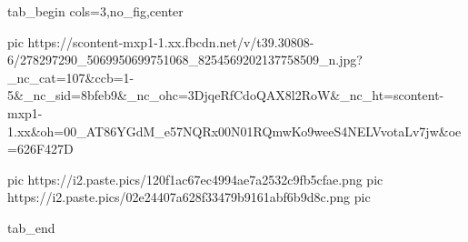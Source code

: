  
 
 
 
 


\ifcmt
  tab_begin cols=3,no_fig,center

     pic https://scontent-mxp1-1.xx.fbcdn.net/v/t39.30808-6/278297290_5069950699751068_8254569202137758509_n.jpg?_nc_cat=107&ccb=1-5&_nc_sid=8bfeb9&_nc_ohc=3DjqeRfCdoQAX8l2RoW&_nc_ht=scontent-mxp1-1.xx&oh=00_AT86YGdM_e57NQRx00N01RQmwKo9weeS4NELVvotaLv7jw&oe=626F427D

		 pic https://i2.paste.pics/120f1ac67ec4994ae7a2532c9fb5cfae.png
		 pic https://i2.paste.pics/02e24407a628f33479b9161abf6b9d8c.png
		 pic 

  tab_end
\fi
